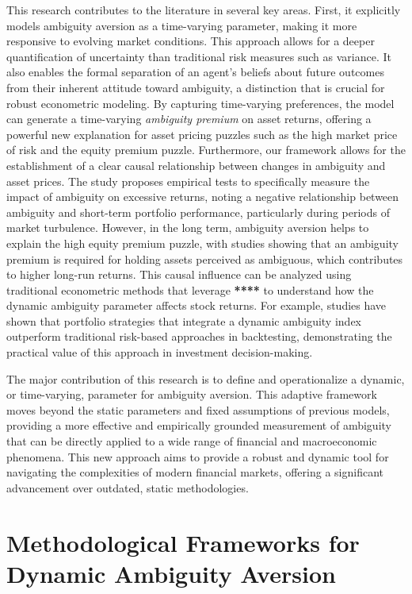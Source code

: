 \documentclass[preprint,12pt,authoryear]{elsarticle}
\begin{document}
This research contributes to the literature in several key areas. First, it explicitly models ambiguity aversion as a time-varying parameter, making it more responsive to evolving market conditions. This approach allows for a deeper quantification of uncertainty than traditional risk measures such as variance. It also enables the formal separation of an agent's beliefs about future outcomes from their inherent attitude toward ambiguity, a distinction that is crucial for robust econometric modeling. By capturing time-varying preferences, the model can generate a time-varying \textit{ambiguity premium} on asset returns, offering a powerful new explanation for asset pricing puzzles such as the high market price of risk and the equity premium puzzle. Furthermore, our framework allows for the establishment of a clear causal relationship between changes in ambiguity and asset prices. The study proposes empirical tests to specifically measure the impact of ambiguity on excessive returns, noting a negative relationship between ambiguity and short-term portfolio performance, particularly during periods of market turbulence. However, in the long term, ambiguity aversion helps to explain the high equity premium puzzle, with studies showing that an ambiguity premium is required for holding assets perceived as ambiguous, which contributes to higher long-run returns. This causal influence can be analyzed using traditional econometric methods that leverage \textbf{****} to understand how the dynamic ambiguity parameter affects stock returns. For example, studies have shown that portfolio strategies that integrate a dynamic ambiguity index outperform traditional risk-based approaches in backtesting, demonstrating the practical value of this approach in investment decision-making. 

The major contribution of this research is to define and operationalize a dynamic, or time-varying, parameter for ambiguity aversion. This adaptive framework moves beyond the static parameters and fixed assumptions of previous models, providing a more effective and empirically grounded measurement of ambiguity that can be directly applied to a wide range of financial and macroeconomic phenomena. This new approach aims to provide a robust and dynamic tool for navigating the complexities of modern financial markets, offering a significant advancement over outdated, static methodologies.


\section{Methodological Frameworks for Dynamic Ambiguity Aversion}
\end{document}
